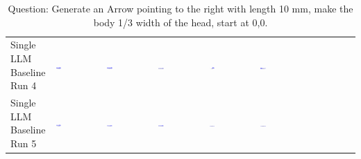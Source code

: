 \begin{table}
\begin{tabular}{@{}mmmmmm@{}}
    \makecell{Single LLM \\ Baseline \\ Run 4} & \includegraphics[width=0.13\textwidth]{./run_4/png/gpt-4o_results/Arrow.png} & \includegraphics[width=0.13\textwidth]{./run_4/png/o1-preview_results/Arrow.png} & \includegraphics[width=0.13\textwidth]{./run_4/png/claude-3-5-sonnet-20240620_results/Arrow.png} & \includegraphics[width=0.13\textwidth]{./run_4/png/watsonx_meta-llama_llama-3-1-70b-instruct_results/Arrow.png} & \includegraphics[width=0.13\textwidth]{./run_4/png/watsonx_meta-llama_llama-3-405b-instruct_results/Arrow.png} \\
    \makecell{Single LLM \\ Baseline \\ Run 5} & \includegraphics[width=0.13\textwidth]{./run_5/png/gpt-4o_results/Arrow.png} & \includegraphics[width=0.13\textwidth]{./run_5/png/o1-preview_results/Arrow.png} & \includegraphics[width=0.13\textwidth]{./run_5/png/claude-3-5-sonnet-20240620_results/Arrow.png} & \includegraphics[width=0.13\textwidth]{./run_5/png/watsonx_meta-llama_llama-3-1-70b-instruct_results/Arrow.png} & \includegraphics[width=0.13\textwidth]{./run_5/png/watsonx_meta-llama_llama-3-405b-instruct_results/Arrow.png} \\
    \bottomrule
  \end{tabular}
  \caption*{Question: Generate an Arrow pointing to the right with length 10 mm, make the body 1/3 width of the head, start at 0,0.}
\end{table}

